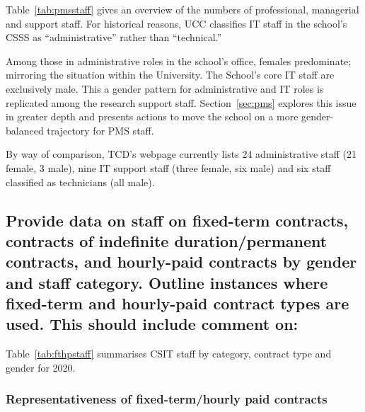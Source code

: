 
Table~\ref{tab:pmsstaff} gives an overview of the numbers of professional,
managerial and support staff. For historical reasons, UCC classifies
IT staff in the school's \ac{CSSS} as 
``administrative'' rather than ``technical.''



Among those in administrative roles in the school's office, 
females predominate; mirroring the situation within the University.
The School's core IT staff are exclusively male. This a gender
pattern for administrative and IT roles is replicated among the 
research support staff.
Section~\ref{sec:pms} explores this issue in greater depth 
and presents actions to move the school on a more gender-balanced
trajectory for PMS staff.

By way of comparison, TCD's webpage currently lists 24 administrative 
staff (21 female, 3 male), nine IT support staff (three female, six
male) and six staff classified as technicians (all male).

\subsection{Provide data on staff on fixed-term contracts, contracts of indefinite duration/permanent contracts, and hourly-paid contracts by gender and staff category. Outline instances where fixed-term and hourly-paid contract types are used. This should include comment on:}

Table~\ref{tab:fthpstaff} summarises CSIT staff by category, contract 
type and gender for 2020.



\subsubsection{Representativeness of fixed-term/hourly paid contracts}

